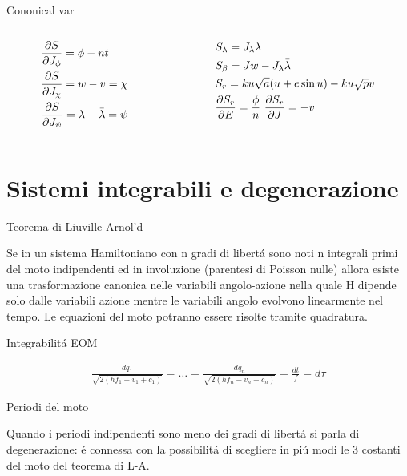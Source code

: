 \begin{wordonframe}{Cononical var}

\begin{columns} \begin{column}{0.5\textwidth}

\begin{align*}
&\PDy{J_{\phi}}{S}=\phi-nt\\
&\PDy{J_{\chi}}{S}=w-v=\chi\\
&\PDy{J_{\psi}}{S}=\lambda-\bar{\lambda}=\psi
\end{align*}

\end{column} \begin{column}{0.5\textwidth}

\begin{align*}
&S_{\lambda}=J_{\lambda}\lambda\\
&S_{\beta}=Jw-J_{\lambda}\bar{\lambda}\\
&S_r=ku\sqrt{a}(u+e\sin{u})-ku\sqrt{p}v\\
&\PDy{E}{S_r}=\frac{\phi}{n} \ \PDy{J}{S_r}=-v
\end{align*}

\end{column} \end{columns}


\end{wordonframe}


\section{Sistemi integrabili e degenerazione}

\begin{frame}{Teorema di Liuville-Arnol'd}

Se in un sistema Hamiltoniano con n gradi di libert\'a sono noti n integrali primi del moto indipendenti ed in involuzione (parentesi di Poisson nulle) allora esiste una trasformazione canonica nelle variabili angolo-azione nella quale H dipende solo dalle variabili azione mentre le variabili angolo evolvono linearmente nel tempo. Le equazioni del moto potranno essere risolte tramite quadratura.


\end{frame}

\begin{wordonframe}{Integrabilit\'a EOM}

\begin{align*}
\frac{dq_1}{\sqrt{2(hf_1-v_1+c_1)}}=\ldots=\frac{dq_n}{\sqrt{2(hf_n-v_n+c_n)}}=\frac{dt}{f}=d\tau
\end{align*}

\end{wordonframe}

\begin{frame}{Periodi del moto}

Quando i periodi indipendenti sono meno dei gradi di libert\'a si parla di degenerazione: \'e connessa con la possibilit\'a di scegliere in pi\'u modi le 3 costanti del moto del teorema di L-A.

\end{frame}
